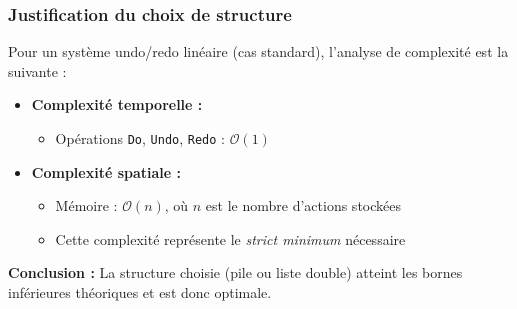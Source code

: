 \documentclass[10pt]{article} %
\begin{document}
\subsubsection{Justification du choix de structure}

Pour un système undo/redo linéaire (cas standard), l'analyse de complexité est la suivante :

\vspace{0.5em}

\begin{itemize}
    \item \textbf{Complexité temporelle :}
    \begin{itemize}
        \item Opérations \texttt{Do}, \texttt{Undo}, \texttt{Redo} : $\mathcal{O}(1)$
    \end{itemize}
    
    \item \textbf{Complexité spatiale :}
    \begin{itemize}
        \item Mémoire : $\mathcal{O}(n)$, où $n$ est le nombre d'actions stockées
        \item Cette complexité représente le \emph{strict minimum} nécessaire
    \end{itemize}
\end{itemize}

\vspace{0.5em}


\vspace{0.5em}

\textbf{Conclusion :} La structure choisie (pile ou liste double) atteint les bornes inférieures théoriques et est donc optimale. \\
\end{document}
